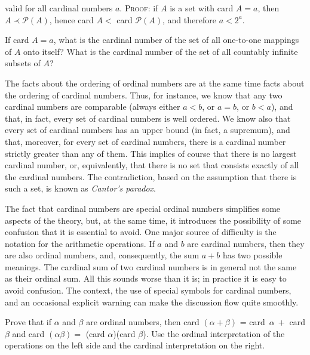 valid for all cardinal numbers $a$. \textsc{Proof}: if $A$ is a set with card $A = a$, then $A \prec \mathcal{P}(A)$, hence card $A <$ card $\mathcal{P}(A)$, and therefore $a < 2^{a}$. 

\begin{exercise} If card $A = a$, what is the cardinal number of the set of all one-to-one mappings of $A$ onto itself? What is the cardinal number of the set of all countably infinite subsets of $A$?
\end{exercise}

The facts about the ordering of ordinal numbers are at the same time facts about the ordering of cardinal numbers. Thus, for instance, we know that any two cardinal numbers are comparable (always either $a < b$, or $a = b$, or $b < a$), and that, in fact, every set of cardinal numbers is well ordered. We know also that every set of cardinal numbers has an upper bound (in fact, a supremum), and that, moreover, for every set of cardinal numbers, there is a cardinal number strictly greater than any of them. This implies of course that there is no largest cardinal number, or, equivalently, that there is no set that consists exactly of all the cardinal numbers. The contradiction, based on the assumption that there is such a set, is known as \textit{Cantor's paradox}. 

The fact that cardinal numbers are special ordinal numbers simplifies some aspects of the theory, but, at the same time, it introduces the possibility of some confusion that it is essential to avoid. One major source of difficulty is the notation for the arithmetic operations. If $a$ and $b$ are cardinal numbers, then they are also ordinal numbers, and, consequently, the sum $a + b$ has two possible meanings. The cardinal sum of two cardinal numbers is in general not the same as their ordinal sum. All this sounds worse than it is; in practice it is easy to avoid confusion. The context, the use of special symbols for cardinal numbers, and an occasional explicit warning can make the discussion flow quite smoothly. 

\begin{exercise} Prove that if $\alpha$ and $\beta$ are ordinal numbers, then card $(\alpha + \beta)$ = card~$\alpha\ +$ card $\beta$ and card $(\alpha \beta) =$ (card $\alpha$)(card $\beta$). Use the ordinal interpretation of the operations on the left side and the cardinal interpretation on the right. 
\end{exercise}

